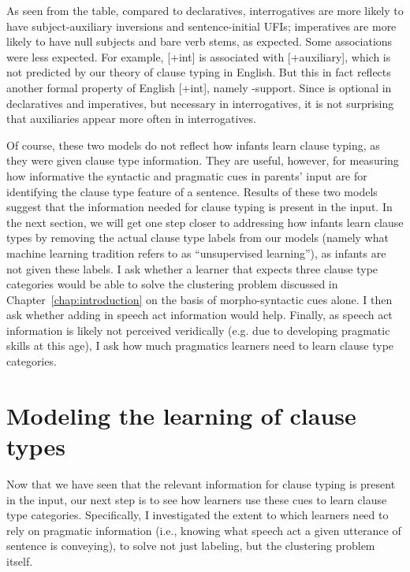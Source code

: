 As seen from the table, compared to declaratives, interrogatives are more likely to have subject-auxiliary inversions and sentence-initial UFIs; imperatives are more likely to have null subjects and bare verb stems, as expected. Some associations were less expected. For example, [+int] is associated with [+auxiliary], which is not predicted by our theory of clause typing in English. But this in fact reflects another formal property of English [+int], namely -support. Since  is optional in declaratives and imperatives, but necessary in interrogatives, it is not surprising that auxiliaries appear more often in interrogatives. 


Of course, these two models do not reflect how infants learn clause typing, as they were given clause type information. They are useful, however, for measuring how informative the syntactic and pragmatic cues in parents' input are for identifying the clause type feature of a sentence. Results of these two models suggest that the information needed for clause typing is present in the input. In the next section, we will get one step closer to addressing how infants learn clause types by removing the actual clause type labels from our models (namely what machine learning tradition refers to as ``unsupervised learning''), as infants are not given these labels. I ask whether a learner that expects three clause type categories would be able to solve the clustering problem discussed in Chapter~\ref{chap:introduction} on the basis of morpho-syntactic cues alone. I then ask whether adding in speech act information would help. Finally, as speech act information is likely not perceived veridically (e.g. due to developing pragmatic skills at this age), I ask how much pragmatics learners need to learn clause type categories. 


\section{Modeling the learning of clause types}
\label{sec:engcl:model}
Now that we have seen that the relevant information for clause typing is present in the input, our next step is to see how learners use these cues to learn clause type categories. Specifically, I investigated the extent to which learners need to rely on pragmatic information (i.e., knowing what speech act a given utterance of sentence is conveying), to solve not just labeling, but the clustering problem itself. 

